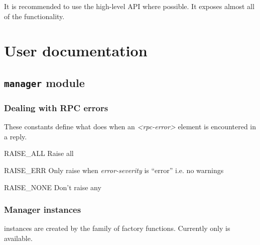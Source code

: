 \documentclass[a4paper,10pt,english]{manual}
\begin{document}
It is recommended to use the high-level  API where possible. It exposes almost all of the functionality.

\resetcurrentobjects
\hypertarget{--doc-userdoc}{}

\hypertarget{userdoc}{}\chapter{User documentation}

\resetcurrentobjects
\hypertarget{--doc-userdoc/manager}{}

\section{\texttt{manager} module}
\hypertarget{module-ncclient.manager}{}
\modulesynopsis{}

\subsection{Dealing with RPC errors}

These constants define what \hyperlink{ncclient.manager.Manager}{} does when an \emph{\textless{}rpc-error\textgreater{}} element is encountered in a reply.

\hypertarget{ncclient.manager.RAISE_ALL}{}\begin{datadesc}{RAISE\_ALL}
Raise all \hyperlink{ncclient.operations.rpc.RPCError}{}
\end{datadesc}

\hypertarget{ncclient.manager.RAISE_ERR}{}\begin{datadesc}{RAISE\_ERR}
Only raise when \emph{error-severity} is ``error'' i.e. no warnings
\end{datadesc}

\hypertarget{ncclient.manager.RAISE_NONE}{}\begin{datadesc}{RAISE\_NONE}
Don't raise any
\end{datadesc}


\subsection{Manager instances}

\hyperlink{ncclient.manager.Manager}{} instances are created by the \hyperlink{ncclient.manager.connect}{} family of factory functions. Currently only \hyperlink{ncclient.manager.connect_ssh}{} is available.
\end{document}
